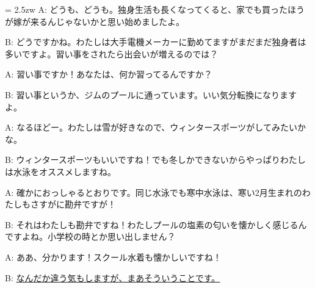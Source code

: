 \documentclass[11pt]{amsart}
\title{}
\author{}
\newenvironment{hangall}[1]{\hangindent = 2.5zw\everypar{\hangindent = 2.5zw}}{}
\begin{document}
\maketitle
\begin{hangall}{}%
A: どうも、どうも。独身生活も長くなってくると、家でも買ったほうが嫁が来るんじゃないかと思い始めましたよ。

B: どうですかね。わたしは大手電機メーカーに勤めてますがまだまだ独身者は多いですよ。習い事をされたら出会いが増えるのでは？

A: 習い事ですか！あなたは、何か習ってるんですか？

B: 習い事というか、ジムのプールに通っています。いい気分転換になりますよ。

A: なるほどー。わたしは雪が好きなので、ウィンタースポーツがしてみたいかな。

B: ウィンタースポーツもいいですね！でも冬しかできないからやっぱりわたしは水泳をオススメしますね。

A: 確かにおっしゃるとおりです。同じ水泳でも寒中水泳は、寒い2月生まれのわたしもさすがに勘弁ですが！

B: それはわたしも勘弁ですね！わたしプールの塩素の匂いを懐かしく感じるんですよね。小学校の時とか思い出しません？

A: ああ、分かります！スクール水着も懐かしいですね！

B: \ul{なんだか違う気もしますが、まあそういうことです。}\end{hangall}
\end{document}
